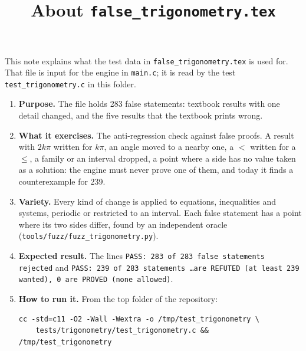\documentclass[11pt,a4paper]{article}
\title{About \texttt{false\_trigonometry.tex}}
\author{}
\date{}
\begin{document}
\maketitle
This note explains what the test data in \texttt{false\_trigonometry.tex} is used for. That file is input for the engine in \texttt{main.c}; it is read by the test \texttt{test\_trigonometry.c} in this folder.

\begin{enumerate}
\item \textbf{Purpose.} The file holds 283 false statements: textbook results with one detail changed, and the five results that the textbook prints wrong.

\item \textbf{What it exercises.} The anti-regression check against false proofs. A result with $2k\pi$ written for $k\pi$, an angle moved to a nearby one, a $<$ written for a $\le$, a family or an interval dropped, a point where a side has no value taken as a solution: the engine must never prove one of them, and today it finds a counterexample for 239.

\item \textbf{Variety.} Every kind of change is applied to equations, inequalities and systems, periodic or restricted to an interval. Each false statement has a point where its two sides differ, found by an independent oracle (\texttt{tools/fuzz/fuzz\_trigonometry.py}).

\item \textbf{Expected result.} The lines \texttt{PASS: 283 of 283 false statements rejected} and \texttt{PASS: 239 of 283 statements \ldots are REFUTED (at least 239 wanted), 0 are PROVED (none allowed)}.

\item \textbf{How to run it.} From the top folder of the repository:
\begin{verbatim}
cc -std=c11 -O2 -Wall -Wextra -o /tmp/test_trigonometry \
    tests/trigonometry/test_trigonometry.c && /tmp/test_trigonometry
\end{verbatim}
\end{enumerate}
\end{document}
